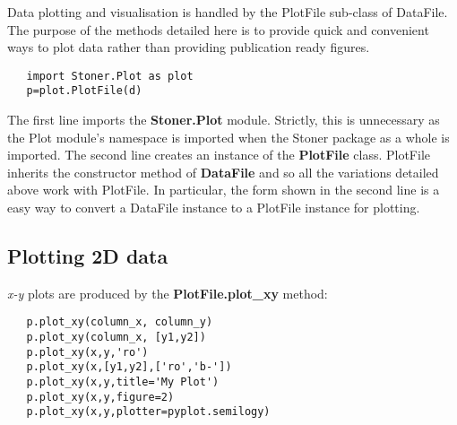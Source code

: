 \documentclass[a4paper,11pt]{scrartcl}
\begin{document}
Data plotting and visualisation is handled by the PlotFile sub-class of DataFile. The purpose of the methods detailed here is to provide quick and convenient ways to plot data rather than providing publication ready figures.

\begin{lstlisting}
   import Stoner.Plot as plot
   p=plot.PlotFile(d)
\end{lstlisting}

The first line imports the \textbf{Stoner.Plot} module. Strictly, this is unnecessary as the Plot module's namespace is imported when the Stoner package as a whole is imported. The second line creates an instance of the \textbf{PlotFile} class. PlotFile inherits the constructor method of \textbf{DataFile} and so all the variations detailed above work with PlotFile. In particular, the form shown in the second line is a easy way to convert a DataFile instance to a PlotFile instance for plotting.

\subsection{Plotting 2D data}

\textit{x-y} plots are produced by the \textbf{PlotFile.plot\_xy} method:

\begin{lstlisting}
   p.plot_xy(column_x, column_y)
   p.plot_xy(column_x, [y1,y2])
   p.plot_xy(x,y,'ro')
   p.plot_xy(x,[y1,y2],['ro','b-'])
   p.plot_xy(x,y,title='My Plot')
   p.plot_xy(x,y,figure=2)
   p.plot_xy(x,y,plotter=pyplot.semilogy)
\end{lstlisting}
\end{document}
